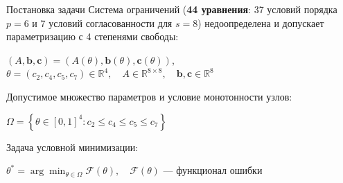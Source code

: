 \begin{frame}{Постановка задачи}
	\vfill %
	\small
	Система ограничений (\textbf{44 уравнения}: 37 условий порядка $p=6$ и 7 условий согласованности для $s=8$) недоопределена и допускает параметризацию с 4 степенями свободы:
	
	\begin{tcolorbox}[
		colframe=DeepBlue!35,       %
		colback=DeepBlue!1!Ivory,    %
		boxrule=0.5pt,               %
		arc=3pt,                     %
		top=4pt, bottom=4pt, left=4pt, right=4pt,
		before=\vspace{2pt}, after=\vspace{4pt}
		]
		\centering
		$\displaystyle
		(A, \mathbf{b}, \mathbf{c}) = (A(\theta), \mathbf{b}(\theta), \mathbf{c}(\theta))$, \\
		\vspace{2pt}
		$\displaystyle \theta = (c_2, c_4, c_5, c_7) \in \mathbb{R}^4, \quad A \in \mathbb{R}^{8 \times 8}, \quad \mathbf{b}, \mathbf{c} \in \mathbb{R}^8$
	\end{tcolorbox}
	
	Допустимое множество параметров и условие монотонности узлов:
	\begin{tcolorbox}[
		colframe=Burgundy!35,       %
		colback=Burgundy!1!Ivory,    %
		boxrule=0.5pt, arc=3pt, 
		top=4pt, bottom=4pt, left=4pt, right=4pt,
		before=\vspace{2pt}, after=\vspace{4pt}
		]
		\centering
		$\displaystyle
		\Omega = \left\{ \theta \in [0, 1]^4 : c_2 \le c_4 \le c_5 \le c_7 \right\}$
	\end{tcolorbox}
	
	Задача условной минимизации:
	\begin{tcolorbox}[
		colframe=Burgundy!35, colback=Burgundy!1!Ivory, 
		boxrule=0.5pt, arc=3pt, 
		top=4pt, bottom=4pt, left=4pt, right=4pt,
		before=\vspace{2pt}, after=\vspace{0pt}
		]
		\centering
		$\displaystyle
		\theta^* = \arg\min_{\theta \in \Omega} \mathcal{F}(\theta), \quad \mathcal{F}(\theta) \text{ — функционал ошибки}$
	\end{tcolorbox}
	
	\vfill %
\end{frame}